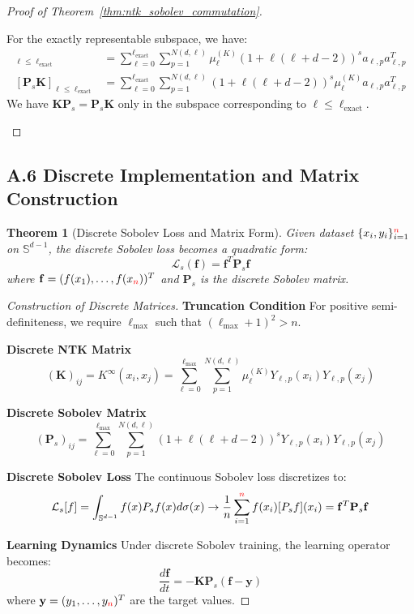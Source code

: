 \documentclass[a4paper]{article}
\theoremstyle{plain}
\newtheorem{theorem}{Theorem}[section]
\theoremstyle{definition}
\theoremstyle{remark}
\begin{document}
\begin{proof}[Proof of Theorem~\ref{thm:ntk_sobolev_commutation}]
\begin{tcolorbox}[colback=purple!5,colframe=purple!60!black,title=\textbf{Partial Commutation Result}]
For the exactly representable subspace, we have:
\begin{align}
[\mathbf{K}\mathbf{P}_s]_{\ell \leq \ell_{\text{exact}}} &= \sum_{\ell=0}^{\ell_{\text{exact}}} \sum_{p=1}^{N(d,\ell)} \mu_\ell^{(K)} (1 + \ell(\ell + d - 2))^s a_{\ell,p} a_{\ell,p}^T \\
[\mathbf{P}_s\mathbf{K}]_{\ell \leq \ell_{\text{exact}}} &= \sum_{\ell=0}^{\ell_{\text{exact}}} \sum_{p=1}^{N(d,\ell)} (1 + \ell(\ell + d - 2))^s \mu_\ell^{(K)} a_{\ell,p} a_{\ell,p}^T
\end{align}
We have $\mathbf{K}\mathbf{P}_s = \mathbf{P}_s\mathbf{K}$ only in the subspace corresponding to $\ell \leq \ell_{\text{exact}}$.
\end{tcolorbox}
\end{proof}





\subsection{A.6 Discrete Implementation and Matrix Construction}

\begin{theorem}[Discrete Sobolev Loss and Matrix Form]
Given dataset $\{x_i, y_i\}_{i=1}^{\textcolor{red}{n}}$ on $\mathbb{S}^{d-1}$, the discrete Sobolev loss becomes a quadratic form:
\[ \mathcal{L}_s(\mathbf{f}) = \mathbf{f}^T \mathbf{P}_s \mathbf{f} \]
where $\mathbf{f} = (f(x_1), \ldots, f(x_{\textcolor{red}{n}}))^T$ and $\mathbf{P}_s$ is the discrete Sobolev matrix.
\end{theorem}

\begin{proof}[Construction of Discrete Matrices]
\textbf{Truncation Condition}
For positive semi-definiteness, we require $\ell_{\max}$ such that $(\ell_{\max}+1)^2 > n$.

\textbf{Discrete NTK Matrix}
\[ (\mathbf{K})_{ij} = K^{\infty}(x_i, x_j) = \sum_{\ell=0}^{\ell_{\max}} \sum_{p=1}^{N(d,\ell)} \mu_\ell^{(K)} Y_{\ell,p}(x_i) Y_{\ell,p}(x_j) \]

\textbf{Discrete Sobolev Matrix}
\[ (\mathbf{P}_s)_{ij} = \sum_{\ell=0}^{\ell_{\max}} \sum_{p=1}^{N(d,\ell)} (1 + \ell(\ell + d - 2))^s Y_{\ell,p}(x_i) Y_{\ell,p}(x_j) \]

\textbf{Discrete Sobolev Loss}
The continuous Sobolev loss discretizes to:
\[ \mathcal{L}_s[f] = \int_{\mathbb{S}^{d-1}} f(x) P_s f(x) d\sigma(x) \rightarrow \frac{1}{n}\sum_{i=1}^{\textcolor{red}{n}} f(x_i) [P_s f](x_i) = \mathbf{f}^T \mathbf{P}_s \mathbf{f} \]

\textbf{Learning Dynamics}
Under discrete Sobolev training, the learning operator becomes:
\[ \frac{d\mathbf{f}}{dt} = -\mathbf{K} \mathbf{P}_s (\mathbf{f} - \mathbf{y}) \]
where $\mathbf{y} = (y_1, \ldots, y_{\textcolor{red}{n}})^T$ are the target values.
\end{proof}
\end{document}
